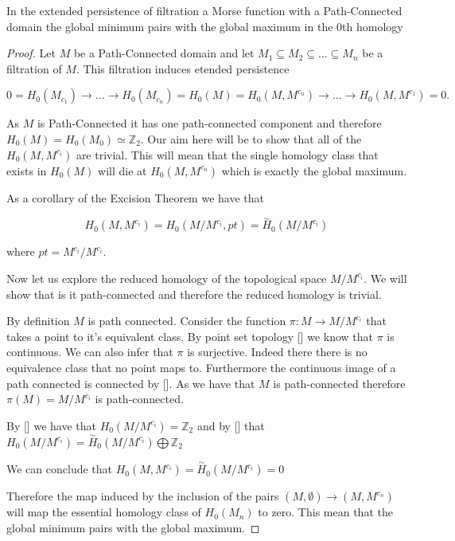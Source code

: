 \begin{prop} In the extended persistence of filtration a Morse function with a Path-Connected domain the global minimum pairs with the global maximum in the 0th homology \end{prop}

\begin{proof}
    Let $M$ be a Path-Connected domain and let $M_1 \subseteq M_2 \subseteq ... \subseteq M_n$ be a filtration of $M$. This filtration induces etended persistence 

$$ 0 = H_0(M_{c_1}) \rightarrow ... \rightarrow H_0(M_{c_n}) = H_0(M) = H_0(M, M^{c_n}) \rightarrow ... \rightarrow H_0(M, M^{c_{1}}) = 0.$$

As $M$ is Path-Connected it has one path-connected component and therefore $H_0(M) = H_0(M_0) \simeq  \mathbb{Z}_2$.  Our aim here will be to show that all of the $H_0(M, M^{c_i})$ are trivial. This will mean that the single homology class that exists in $H_0(M)$ will die at $H_0(M, M^{c_n})$ which is exactly the global maximum.


As a corollary of the Excision Theorem we have that

$$H_0(M, M^{c_i}) = H_0(M / M^{c_i}, pt) = \overset{\sim}{H}_0(M / M^{c_i})$$  

where $pt = M^{c_i} / M^{c_i}$.

Now let us explore the reduced homology of the topological space $M / M^{c_i}$. We will show that is it path-connected and therefore the reduced homology is trivial.


By definition $M$ is path connected. Consider the function $\pi: M \to M/ M^{c_i}$ that takes a point to it's equivalent class. By point set topology [] we know that $\pi$ is continuous. We can also infer that $\pi$ is surjective. Indeed there there is no equivalence class that no point maps to. Furthermore the continuous image of a path connected is connected by []. As we have that $M$ is path-connected therefore $\pi(M) = M / M^{c_i}$ is path-connected. 

By [] we have that $H_0(M / M^{c_i}) = \mathbb{Z}_2$ and by [] that $H_0(M / M^{c_i}) = \overset{\sim}{H}_0(M / M^{c_i}) \bigoplus \mathbb{Z}_2$

We can conclude that $H_0(M, M^{c_i}) = \overset{\sim}{H}_0(M / M^{c_i}) = 0$

Therefore the map induced by the inclusion of the pairs $(M, \emptyset) \to (M, M^{c_n})$ will map the essential homology class of $H_0(M_n)$ to zero. This mean that the global minimum pairs with the global maximum.

\end{proof}

